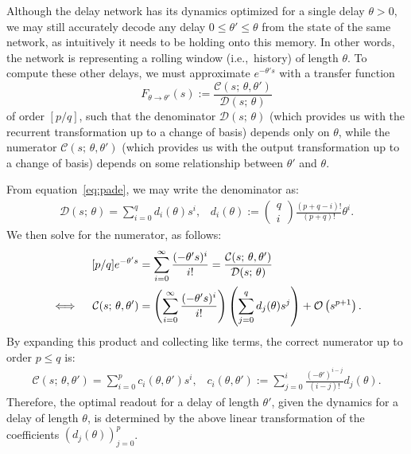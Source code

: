 Although the delay network has its dynamics optimized for a single delay $\theta > 0$, we may still accurately decode any delay $0 \le \theta' \le \theta$ from the state of the same network, as intuitively it needs to be holding onto this memory.
In other words, the network is representing a rolling window (i.e.,~history) of length $\theta$.
To compute these other delays, we must approximate $e^{-\theta' s}$ with a transfer function
$$F_{\theta \rightarrow \theta'}(s) := \frac{\mathcal{C}(s; \, \theta, \theta')}{\mathcal{D}(s; \, \theta)}$$
of order $[p / q]$, such that the denominator $\mathcal{D}(s; \, \theta)$ (which provides us with the recurrent transformation up to a change of basis) depends only on $\theta$, while the numerator $\mathcal{C}(s; \, \theta, \theta')$ (which provides us with the output transformation up to a change of basis) depends on some relationship between $\theta'$ and $\theta$.

From equation~\ref{eq:pade}, we may write the denominator as:
\begin{align*}
\mathcal{D}(s; \, \theta) = \sum_{i=0}^q d_i(\theta) s^i \text{,} \quad d_i(\theta) := \begin{pmatrix}q \\ i\end{pmatrix} \frac{(p + q - i)!}{(p + q)!} \theta^i \text{.}
\end{align*}
We then solve for the numerator, as follows:
\begin{align*}
&& [p/q] e^{-\theta' s} &= \sum_{i=0}^\infty \frac{(-\theta' s)^i}{i !} = \frac{\mathcal{C}(s; \, \theta, \theta')}{\mathcal{D}(s; \, \theta)} & \\
&& \iff \quad \mathcal{C}(s; \, \theta, \theta') &= \left( \sum_{i=0}^\infty \frac{(-\theta' s)^i}{i !} \right) \left( \sum_{j=0}^q d_j(\theta) s^j \right) + \mathcal{O}\left({s^{p + 1}}\right) \text{.}
\end{align*}
By expanding this product and collecting like terms, the correct numerator up to order $p \le q$ is:
\begin{align*}
\mathcal{C}(s; \, \theta, \theta') = \sum_{i=0}^p c_i(\theta, \theta') s^i \text{,} \quad c_i(\theta, \theta') :=  \sum_{j=0}^i \frac{(- \theta')^{i - j}}{(i - j)!} d_j(\theta) \text{.}
\end{align*}
Therefore, the optimal readout for a delay of length $\theta'$, given the dynamics for a delay of length $\theta$, is determined by the above linear transformation of the coefficients $\left( d_j(\theta) \right)_{j=0}^p$.

